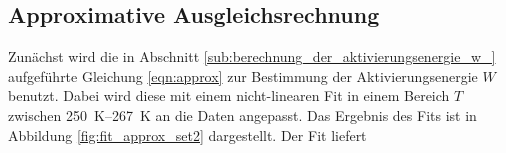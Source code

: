 \subsection{Approximative Ausgleichsrechnung}
\label{subsec:approx}
Zunächst wird die in Abschnitt \ref{sub:berechnung_der_aktivierungsenergie_w_}
aufgeführte Gleichung \ref{eqn:approx} zur Bestimmung der Aktivierungsenergie
$W$ benutzt. Dabei wird diese mit einem nicht-linearen Fit in einem Bereich
$T$ zwischen \SIrange{250}{267}{\kelvin} an die Daten angepasst.
Das Ergebnis des Fits ist in Abbildung \ref{fig:fit_approx_set2} dargestellt.
Der Fit liefert
\begin{equation*}
    
\end{equation*}
